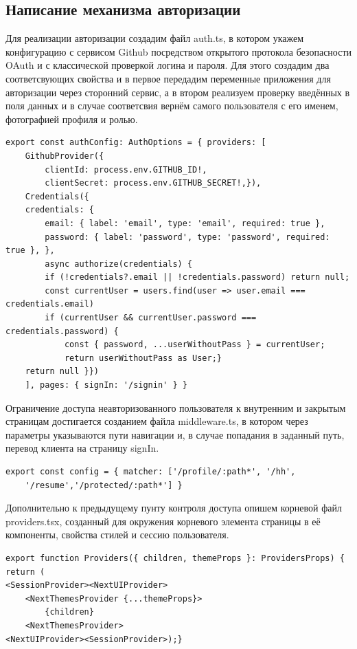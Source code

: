 \documentclass[master, och, pract]{SCWorks}
\begin{document}
\subsection{Написание механизма авторизации}
Для реализации авторизации создадим файл auth.ts, в котором укажем конфигурацию с сервисом Github посредством открытого протокола безопасности OAuth и с классической проверкой логина и пароля. Для этого создадим два соответсвующих свойства и в первое передадим переменные приложения для авторизации через сторонний сервис, а в втором реализуем проверку введённых в поля данных и в случае соответсвия вернём самого пользователя с его именем, фотографией профиля и ролью\cite{Fain_2022}.
\begin{verbatim}
export const authConfig: AuthOptions = { providers: [
    GithubProvider({
        clientId: process.env.GITHUB_ID!,
        clientSecret: process.env.GITHUB_SECRET!,}),
    Credentials({
    credentials: {
        email: { label: 'email', type: 'email', required: true },
        password: { label: 'password', type: 'password', required: true }, },
        async authorize(credentials) {
        if (!credentials?.email || !credentials.password) return null;
        const currentUser = users.find(user => user.email === credentials.email)
        if (currentUser && currentUser.password === credentials.password) {
            const { password, ...userWithoutPass } = currentUser;
            return userWithoutPass as User;}
    return null }})
    ], pages: { signIn: '/signin' } }
\end{verbatim}

Ограничение доступа неавторизованного пользователя к внутренним и закрытым страницам достигается созданием файла middleware.ts, в котором через параметры указываются пути навигации и, в случае попадания в заданный путь, перевод клиента на страницу signIn.
\begin{verbatim}
export const config = { matcher: ['/profile/:path*', '/hh', 
    '/resume','/protected/:path*'] }
\end{verbatim}

Дополнительно к предыдущему пунту контроля доступа опишем корневой файл providers.tsx, созданный для окружения корневого элемента страницы в её компоненты, свойства стилей и сессию пользователя.
\begin{verbatim}
export function Providers({ children, themeProps }: ProvidersProps) {
return (
<SessionProvider><NextUIProvider>
    <NextThemesProvider {...themeProps}>
        {children}
    <NextThemesProvider>
<NextUIProvider><SessionProvider>);}    
\end{verbatim}
\end{document}
